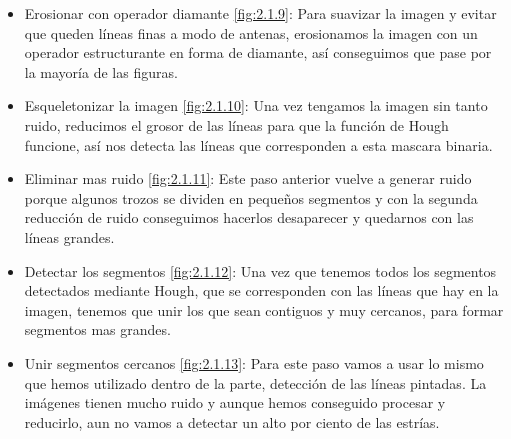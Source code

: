 \begin{itemize}
	\item Erosionar con operador diamante \ref{fig:2.1.9}:
Para suavizar la imagen y evitar que queden líneas finas a modo de antenas, erosionamos la imagen con un operador estructurante en forma de diamante, así conseguimos que pase por la mayoría de las figuras.
	\item Esqueletonizar la imagen \ref{fig:2.1.10}:
Una vez tengamos la imagen sin tanto ruido, reducimos el grosor de las líneas para que la función de Hough funcione, así nos detecta las líneas que corresponden a esta mascara binaria.
	\item Eliminar mas ruido \ref{fig:2.1.11}:
Este paso anterior vuelve a generar ruido porque algunos trozos se dividen en pequeños segmentos y con la segunda reducción de ruido conseguimos hacerlos desaparecer y quedarnos con las líneas grandes.
	\item Detectar los segmentos \ref{fig:2.1.12}:
Una vez que tenemos todos los segmentos detectados mediante Hough, que se corresponden con las líneas que hay en la imagen, tenemos que unir los que sean contiguos y muy cercanos, para formar segmentos mas grandes.
	\item Unir segmentos cercanos \ref{fig:2.1.13}:
Para este paso vamos a usar lo mismo que hemos utilizado dentro de la parte, detección de las líneas pintadas.
La imágenes tienen mucho ruido y aunque hemos conseguido procesar y reducirlo, aun no vamos a detectar un alto por ciento de las estrías.
\end{itemize}



